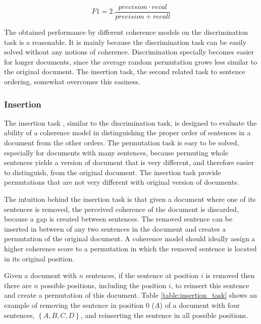 \begin{equation}
F1 = 2.\frac{precision \cdot recal}{precision + recall}
\end{equation}

The obtained performance by different coherence models \cite{} on the discrimination task is a reasonable. 
It is mainly because the discrimination task can be easily solved without any notions of coherence. 
Discrimination specially becomes easier for longer documents, since the average random permutation grows less similar to the original document. 
The insertion task, the second related task to sentence ordering, somewhat overcomes this easiness. 


\subsubsection{Insertion}

The insertion task \cite{chenerdong07}, similar to the discrimination task, is designed to evaluate the ability of a coherence model in distinguishing the proper order of sentences in a document from the other orders. 
The permutation task is easy to be solved, especially for documents with many sentences, because  permuting whole sentences yields a version of document that is very different, and therefore easier to distinguish, from the original document. 
The insertion task provide permutations that are not very different with original version of documents. 

The intuition behind the insertion task is that given a document where one of its sentences is removed, the perceived coherence of the document is discarded, because a gap is created between sentences. 
The removed sentence can be inserted in between of any two sentences in the document and creates a permutation of the original document.  
A coherence model should ideally assign a higher coherence score to a permutation in which the removed sentence is located in its original position. 

Given a document with $n$ sentences, if the sentence at position $i$ is removed then there are $n$ possible positions, including the position $i$, to reinsert this sentence and create a permutation of this document. 
Table \ref{table:insertion_task} shows an example of removing the sentence in position $0$ ($\underline{A}$) of a document with four sentences, $\left \{ A, B, C, D \right \}$, and reinserting the sentence in all possible positions. 
 

